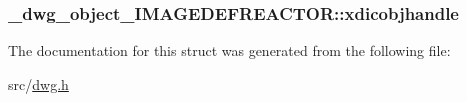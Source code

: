 \hypertarget{struct__dwg__object__IMAGEDEFREACTOR_aad22f8bee64a1953321dd506a581f3a1}{
\subsubsection[{xdicobjhandle}]{ {\bf \-\_\-dwg\-\_\-object\-\_\-\-I\-M\-A\-G\-E\-D\-E\-F\-R\-E\-A\-C\-T\-O\-R\-::xdicobjhandle}}}\label{struct__dwg__object__IMAGEDEFREACTOR_aad22f8bee64a1953321dd506a581f3a1}


\-The documentation for this struct was generated from the following file\-:\begin{DoxyCompactItemize}
\item 
src/\hyperlink{dwg_8h}{dwg.\-h}\end{DoxyCompactItemize}
